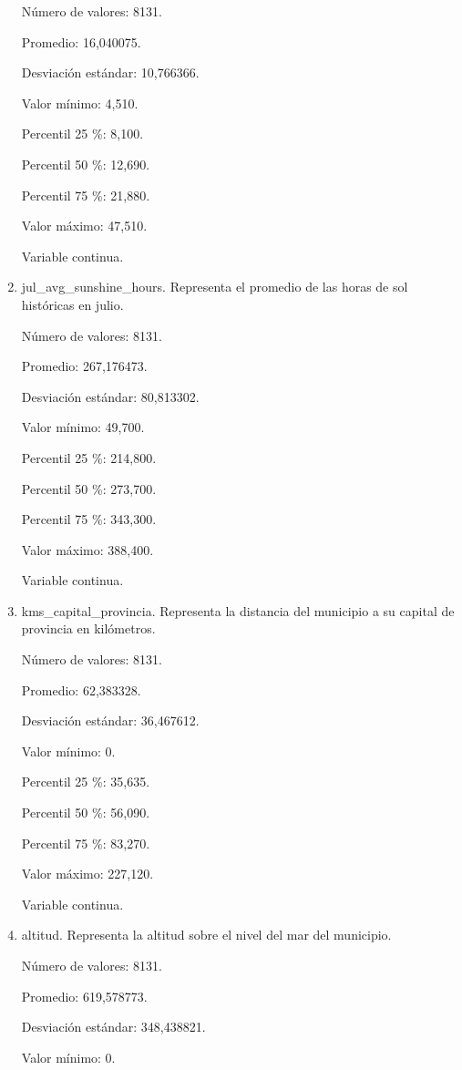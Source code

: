 \begin{enumerate}
	Número de valores: 8131.
	
	Promedio: 16,040075.
	
	Desviación estándar: 10,766366.
	
	Valor mínimo: 4,510.
	
	Percentil 25 \%: 8,100.
	
	Percentil 50 \%: 12,690.
	
	Percentil 75 \%: 21,880.
	
	Valor máximo: 47,510.
	
	Variable continua.

	\item jul\_avg\_sunshine\_hours. Representa el promedio de las horas de sol históricas en julio.
	
	Número de valores: 8131.
	
	Promedio: 267,176473.
	
	Desviación estándar: 80,813302.
	
	Valor mínimo: 49,700.
	
	Percentil 25 \%: 214,800.
	
	Percentil 50 \%: 273,700.
	
	Percentil 75 \%: 343,300.
	
	Valor máximo: 388,400.
	
	Variable continua.

	\item kms\_capital\_provincia. Representa la distancia del municipio a su capital de provincia en kilómetros.
	
	Número de valores: 8131.
	
	Promedio: 62,383328.
	
	Desviación estándar: 36,467612.
	
	Valor mínimo: 0.
	
	Percentil 25 \%: 35,635.
	
	Percentil 50 \%: 56,090.
	
	Percentil 75 \%: 83,270.
	
	Valor máximo: 227,120.
	
	Variable continua.

	\item altitud. Representa la altitud sobre el nivel del mar del municipio.
	
	Número de valores: 8131.
	
	Promedio: 619,578773.
	
	Desviación estándar: 348,438821.
	
	Valor mínimo: 0.
	

\end{enumerate}
